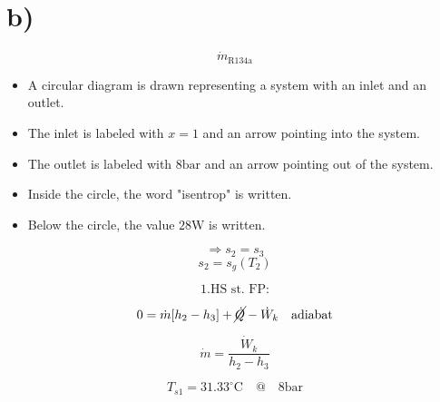 

\section*{b)}

\[
\dot{m}_{\text{R134a}}
\]

\begin{itemize}
    \item A circular diagram is drawn representing a system with an inlet and an outlet.
    \item The inlet is labeled with $x=1$ and an arrow pointing into the system.
    \item The outlet is labeled with $8 \text{bar}$ and an arrow pointing out of the system.
    \item Inside the circle, the word "isentrop" is written.
    \item Below the circle, the value $28 \text{W}$ is written.
\end{itemize}

\[
\Rightarrow s_2 = s_3
\]
\[
s_2 = s_g(T_2)
\]

\[
\text{1.HS st. FP:}
\]

\[
0 = \dot{m} [h_2 - h_3] + \cancel{\dot{Q}} - \dot{W}_k \quad \text{adiabat}
\]

\[
\dot{m} = \frac{\dot{W}_k}{h_2 - h_3}
\]

\[
T_{s1} = 31.33^\circ \text{C} \quad @ \quad 8 \text{bar}
\]